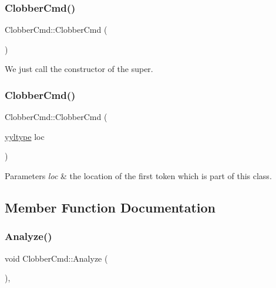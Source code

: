 \subsubsection{\texorpdfstring{Clobber\+Cmd()}{ClobberCmd()}\hspace{0.1cm}{\footnotesize\ttfamily [1/2]}}
{\footnotesize\ttfamily Clobber\+Cmd\+::\+Clobber\+Cmd (\begin{DoxyParamCaption}{ }\end{DoxyParamCaption})\hspace{0.3cm}{\ttfamily [inline]}}

We just call the constructor of the super. \mbox{\label{class_clobber_cmd_acea57358a5f748e72b0b3e0fea717560}} 
\subsubsection{\texorpdfstring{Clobber\+Cmd()}{ClobberCmd()}\hspace{0.1cm}{\footnotesize\ttfamily [2/2]}}
{\footnotesize\ttfamily Clobber\+Cmd\+::\+Clobber\+Cmd (\begin{DoxyParamCaption}\item[{\hyperlink{structyyltype}{yyltype}}]{loc }\end{DoxyParamCaption})\hspace{0.3cm}{\ttfamily [inline]}}


\begin{DoxyParams}{Parameters}
{\em loc} & the location of the first token which is part of this class. \\
\hline
\end{DoxyParams}


\subsection{Member Function Documentation}
\mbox{\label{class_clobber_cmd_a3f519dc016d05f38518e6ded60afaee1}} 
\subsubsection{\texorpdfstring{Analyze()}{Analyze()}}
{\footnotesize\ttfamily void Clobber\+Cmd\+::\+Analyze (\begin{DoxyParamCaption}{ }\end{DoxyParamCaption})\hspace{0.3cm}{\ttfamily [inline]}, {\ttfamily [virtual]}}


